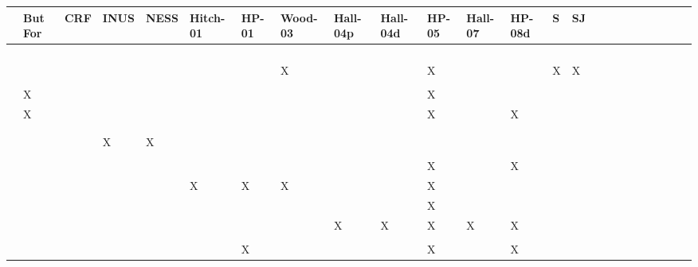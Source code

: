 \documentclass[11pt,a4paper]{book}
\theoremstyle{definition}
\theoremstyle{definition}
\theoremstyle{definition}
\theoremstyle{remark}
\begin{document}
 \begin{table}
\centering
\tiny
\begin{tabular}{lp{0.5cm}p{0.5cm}p{0.5cm}p{0.5cm}p{0.5cm}p{0.5cm}p{0.5cm}p{0.5cm}p{0.5cm}p{0.5cm}p{0.5cm}p{0.5cm}p{0.5cm}p{0.5cm}p{0.5cm}p{0.5cm}p{0.5cm}p{0.5cm}p{0.5cm}p{0.5cm}p{0.5cm}p{0.5cm}p{0.5cm}}
\toprule
	 & But For 	 & CRF	 & INUS	 & NESS	 & Hitch-01	 & HP-01	 & Wood-03	 & Hall-04p	 & Hall-04d	 & HP-05	 & Hall-07	 & HP-08d	 & S	 & SJ	\\
\midrule
\cite{vennekens2010embracing} 	& 	& 	& 	& 	& 	& 	& 	& 	& 	& 	& 	& 	& 	& 	\\
 \cite{bex2010hybrid} 	& 	& 	& 	& 	& 	& 	& 	& 	& 	& 	& 	& 	& 	& 	\\
 \cite{lee2010representing}	& 	& 	& 	& 	& 	& 	& 	& 	& 	& 	& 	& 	& 	& 	\\
 \cite{lifschitz2010translating} 	& 	& 	& 	& 	& 	& 	& 	& 	& 	& 	& 	& 	& 	& 	\\
 \cite{glymour2010actual}	& 	& 	& 	& 	& 	& 	& X	& 	& 	& X	& 	& 	& X	& X	\\
 \cite{claassen2010causal} 	& 	& 	& 	& 	& 	& 	& 	& 	& 	& 	& 	& 	& 	& 	\\
 \cite{gerstenberg2010spreading}	& X	& 	& 	& 	& 	& 	& 	& 	& 	& X	& 	& 	& 	& 	\\
 \cite{halpern2011actual} 	& X 	& 	& 	& 	& 	& 	& 	& 	& 	& X	& 	& X	& 	& 	\\
 \cite{shulz2011if} 	& 	& 	& 	& 	& 	& 	& 	& 	& 	& 	& 	& 	& 	& 	\\
 \cite{briggs2012interventionist}	& 	& 	& 	& 	& 	& 	& 	& 	& 	& 	& 	& 	& 	& 	\\
 \cite{baumgartner2013regularity} 	& 	& 	& X	& X	& 	& 	& 	& 	& 	& 	& 	& 	& 	& 	\\
 \cite{hyttinen2013discovering} 	& 	& 	& 	& 	& 	& 	& 	& 	& 	& 	& 	& 	& 	& 	\\
 \cite{halpern2015graded} 	& 	& 	& 	& 	& 	& 	& 	& 	& 	& X	& 	& X	& 	& 	\\
 \cite{weslake2015partial} 	& 	& 	& 	& 	& X	& X	& X	& 	& 	& X	& 	& 	& 	& 	\\
 \cite{chockler2015causal}  	& 	& 	& 	& 	& 	& 	& 	& 	& 	& X	& 	& 	& 	& 	\\
 \cite{beckers2016general} 	& 	& 	& 	& 	& 	& 	& 	& X	& X	& X	& X	& X	& 	& 	\\
 \cite{schaffer2016grounding}  	& 	& 	& 	& 	& 	& 	& 	& 	& 	& 	& 	& 	& 	& 	\\
 \cite{halpern2016appropriate} 	& 	& 	& 	& 	& 	& X	& 	& 	& 	& X	& 	& X	& 	& 	\\

\end{tabular}
\end{table}
\end{document}
